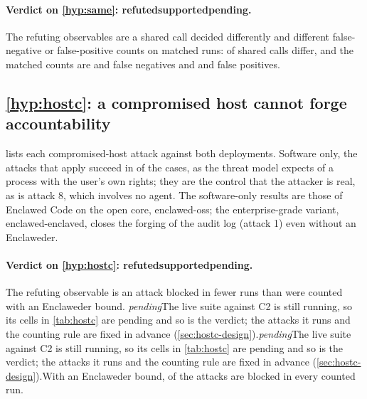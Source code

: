\documentclass[11pt]{article}
\makeatletter
\newcommand{\dev}{Enclaweder}
\newcommand{\cz}{Enclawed Code}
\newcommand{\pending}{\textcolor{red!60!black}{\textit{pending}}}
\newcommand{\pendingfinal}{\pending}
\newcommand{\cz@pendA}{\pendingfinal{}}
\newcommand{\cz@pendB}{\pending{}}
\newcommand{\czIfPending}[3]{\ifx#1\cz@pendA#2\else\ifx#1\cz@pendB#2\else#3\fi\fi}
\newcommand{\czVerdict}[1]{\textbf{\ifcase#1 refuted\or supported\or pending\fi}}
\newcommand{\VerdictHfour}{\czVerdict{\HfourCode}}
\newcommand{\VerdictHfive}{\czVerdict{\HfiveCode}}
\makeatother
\begin{document}
\paragraph{Verdict on \ref{hyp:same}: \VerdictHfour{}.} The refuting
observables are a shared call decided differently and different
false-negative or false-positive counts on matched runs: \SharedCallsDiffer{}
of \SharedCalls{} shared calls differ, and the matched counts are
\MatchedCzOneFN{} and \MatchedCzTwoFN{} false negatives and \MatchedCzOneFP{}
and \MatchedCzTwoFP{} false positives.

\subsection{\ref{hyp:hostc}: a compromised host cannot forge accountability}
\label{sec:res-hostc}

 lists each compromised-host attack against both
deployments. Software only, the attacks that apply succeed in
\HostcSwLost{} of the \HostcSwApplicable{} cases, as the threat model
expects of a process with the user's own rights; they are the control
that the attacker is real, as is attack 8, which involves no agent. The
software-only results are those of \cz{} on the open core, enclawed-oss;
the enterprise-grade variant, enclawed-enclaved, closes the forging of
the audit log (attack 1) even without an \dev{}.

\begin{table}[!htbp]
\centering\small
\caption{Compromised host: a real attacker process running as the user,
against \cz{} software only and with an \dev{} bound. Live runs;
``blocked ($b/n$)'': runs blocked out of runs counted. n/a: the attack
needs a device. Attack 8 involves no agent and is out of scope; ``acted
($a/n$)'' confirms that the attacker acted with the user's full rights.}
\label{tab:hostc}

\end{table}

\paragraph{Verdict on \ref{hyp:hostc}: \VerdictHfive{}.} The refuting
observable is an attack blocked in fewer runs than were counted with an
\dev{} bound.
\czIfPending{\HostcDevBlocked}{The live suite against C2 is still
running, so its cells in \cref{tab:hostc} are pending and so is the
verdict; the attacks it runs and the counting rule are fixed in advance
(\cref{sec:hostc-design}).}{With an \dev{} bound, \HostcDevBlocked{} of
the \HostcAttacks{} attacks are blocked in every counted run.}
\end{document}
